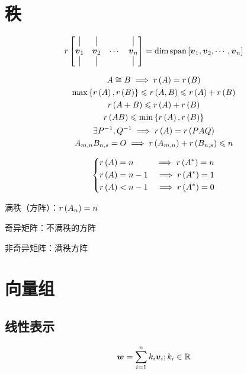 \documentclass{article}
\begin{document}
\section{秩}

\begin{definition}
    \[r\begin{bmatrix}
            \big| & \big| &        & \big| \\
            \boldsymbol v_1  & \boldsymbol v_2  & \cdots & \boldsymbol v_n  \\
            \big| & \big| &        & \big|
        \end{bmatrix}
        =\dim\mathrm{span}\left[\boldsymbol v_1,\boldsymbol v_2,\cdots,\boldsymbol v_n\right]\]
\end{definition}

\[\begin{gathered}
        A\cong B\implies r\left(A\right)=r\left(B\right)\\
        \max\left\{r\left(A\right),r\left(B\right)\right\}\leqslant r\left(A,B\right)\leqslant r\left(A\right)+r\left(B\right)\\
        r\left(A+B\right)\leqslant r\left(A\right)+r\left(B\right)\\
        r\left(AB\right)\leqslant\min\left\{r\left(A\right),r\left(B\right)\right\}\\
        \exists P^{-1},Q^{-1}\implies r\left(A\right)=r\left(PAQ\right)\\
        A_{m,n}B_{n,s}=O\implies r\left(A_{m,n}\right)+r\left(B_{n,s}\right)\leqslant n
    \end{gathered}\]

\[\left\{\begin{aligned}
        r\left(A\right) & =n   & \implies r\left(A^*\right)=n \\
        r\left(A\right) & =n-1 & \implies r\left(A^*\right)=1 \\
        r\left(A\right) & <n-1 & \implies r\left(A^*\right)=0
    \end{aligned}\right.\]

满秩（方阵）：$r\left(A_n\right)=n$

奇异矩阵：不满秩的方阵

非奇异矩阵：满秩方阵

\section{向量组}

\subsection{线性表示}

\[\boldsymbol w=\sum_{i=1}^nk_i\boldsymbol v_i;k_i\in\mathbb R\]
\end{document}

